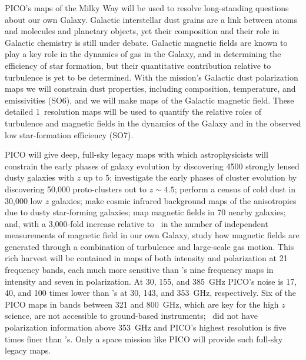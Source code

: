 \documentclass[PICOReport.tex]{subfiles}
\begin{document}
PICO's maps of the Milky Way will be used to resolve long-standing questions about our own Galaxy. Galactic interstellar dust grains are a link between atoms and molecules and planetary objects, yet their composition and their role in Galactic chemistry is still under debate. Galactic magnetic fields are known to play a key role in the dynamics of gas in the Galaxy, and in determining the efficiency of star formation, but their quantitative contribution relative to turbulence is yet to be determined. With the mission's Galactic dust polarization maps we will constrain dust properties, including composition, temperature, and emissivities (SO6), and we will make maps of the Galactic magnetic field. These detailed 1\arcmin\ resolution maps will be used to quantify the relative roles of turbulence and magnetic fields in the dynamics of the Galaxy and in the observed low star-formation efficiency (SO7). 

PICO will give deep, full-sky legacy maps with which astrophysicists will constrain the early phases of galaxy evolution by discovering 4500 strongly lensed dusty galaxies with $z$ up to 5; investigate the early phases of cluster evolution by discovering 50,000 proto-clusters out to $z\sim4.5$; perform a census of cold dust in 30,000 low $z$ galaxies; make cosmic infrared background maps of the anisotropies due to dusty star-forming galaxies; map magnetic fields in 70 nearby galaxies; and, with a 3,000-fold increase relative to \planck\ in the number of independent measurements of magnetic field in our own Galaxy, study how magnetic fields are generated through a combination of turbulence and large-scale gas motion. This rich harvest will be contained in maps of both intensity and polarization at 21 frequency bands, each much more sensitive than \planck 's nine frequency maps in intensity and seven in polarization. At 30, 155, and 385~GHz PICO's noise is 17, 40, and 100 times lower than \planck 's at 30, 143, and 353~GHz, respectively. Six of the PICO maps in bands between 321 and 800~GHz, which are key for the high $z$ science, are not accessible to ground-based instruments; \planck\ did not have polarization information above 353~GHz and PICO's highest resolution is five times finer than \planck 's. Only a space mission like PICO will provide such full-sky legacy maps. 


\end{document}
